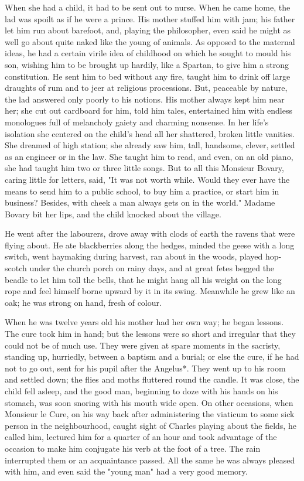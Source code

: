 \documentclass[11pt,twocolumn]{ltugboat}
\begin{document}
When she had a child, it had to be sent out to nurse. When he came home,
the lad was spoilt as if he were a prince. His mother stuffed him
with jam; his father let him run about barefoot, and, playing the
philosopher, even said he might as well go about quite naked like the
young of animals. As opposed to the maternal ideas, he had a certain
virile idea of childhood on which he sought to mould his son, wishing
him to be brought up hardily, like a Spartan, to give him a strong
constitution. He sent him to bed without any fire, taught him to drink
off large draughts of rum and to jeer at religious processions. But,
peaceable by nature, the lad answered only poorly to his notions. His
mother always kept him near her; she cut out cardboard for him, told him
tales, entertained him with endless monologues full of melancholy gaiety
and charming nonsense. In her life's isolation she centered on the
child's head all her shattered, broken little vanities. She dreamed of
high station; she already saw him, tall, handsome, clever, settled as
an engineer or in the law. She taught him to read, and even, on an old
piano, she had taught him two or three little songs. But to all this
Monsieur Bovary, caring little for letters, said, "It was not worth
while. Would they ever have the means to send him to a public school, to
buy him a practice, or start him in business? Besides, with cheek a man
always gets on in the world." Madame Bovary bit her lips, and the child
knocked about the village.

He went after the labourers, drove away with clods of earth the ravens
that were flying about. He ate blackberries along the hedges, minded the
geese with a long switch, went haymaking during harvest, ran about in
the woods, played hop-scotch under the church porch on rainy days, and
at great fetes begged the beadle to let him toll the bells, that he
might hang all his weight on the long rope and feel himself borne upward
by it in its swing. Meanwhile he grew like an oak; he was strong on
hand, fresh of colour.

When he was twelve years old his mother had her own way; he began
lessons. The cure took him in hand; but the lessons were so short and
irregular that they could not be of much use. They were given at spare
moments in the sacristy, standing up, hurriedly, between a baptism and
a burial; or else the cure, if he had not to go out, sent for his pupil
after the Angelus*. They went up to his room and settled down; the
flies and moths fluttered round the candle. It was close, the child
fell asleep, and the good man, beginning to doze with his hands on his
stomach, was soon snoring with his mouth wide open. On other occasions,
when Monsieur le Cure, on his way back after administering the viaticum
to some sick person in the neighbourhood, caught sight of Charles
playing about the fields, he called him, lectured him for a quarter of
an hour and took advantage of the occasion to make him conjugate his
verb at the foot of a tree. The rain interrupted them or an acquaintance
passed. All the same he was always pleased with him, and even said the
"young man" had a very good memory.
\end{document}
